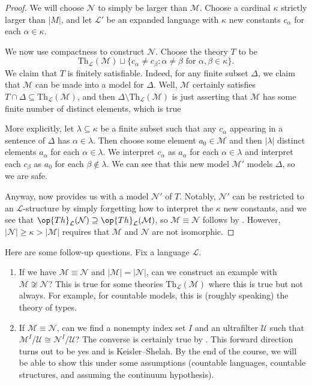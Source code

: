 \documentclass[../notes.tex]{subfiles}
\begin{document}
\begin{proof}
	We will choose $\mathcal N$ to simply be larger than $\mathcal M$. Choose a cardinal $\kappa$ strictly larger than $\left|M\right|$, and let $\mathcal L'$ be an expanded language with $\kappa$ new constants $c_\alpha$ for each $\alpha\in\kappa$.

	We now use compactness to construct $\mathcal N$. Choose the theory $T$ to be
	\[\mathrm{Th}_\mathcal L(\mathcal M)\sqcup\{c_\alpha\ne c_\beta:\alpha\ne\beta\text{ for }\alpha,\beta\in\kappa\}.\]
	We claim that $T$ is finitely satisfiable. Indeed, for any finite subset $\Delta$, we claim that $\mathcal M$ can be made into a model for $\Delta$. Well, $\mathcal M$ certainly satisfies $T\cap\Delta\subseteq\mathrm{Th}_\mathcal L(\mathcal M)$, and then $\Delta\setminus\mathrm{Th}_\mathcal L(\mathcal M)$ is just asserting that $\mathcal M$ has some finite number of distinct elements, which is true
	
	More explicitly, let $\lambda\subseteq\kappa$ be a finite subset such that any $c_\alpha$ appearing in a sentence of $\Delta$ has $\alpha\in\lambda$. Then choose some element $a_0\in\mathcal M$ and then $\left|\lambda\right|$ distinct elements $a_\alpha$ for each $\alpha\in\lambda$. We interpret $c_\alpha$ as $a_\alpha$ for each $\alpha\in\lambda$ and interpret each $c_\beta$ as $a_0$ for each $\beta\notin\lambda$. We can see that this new model $\mathcal M'$ models $\Delta$, so we are safe.

	Anyway,  now provides us with a model $\mathcal N'$ of $T$. Notably, $\mathcal N'$ can be restricted to an $\mathcal L$-structure by simply forgetting how to interpret the $\kappa$ new constants, and we see that $\op{Th}_\mathcal L(\mathcal N)\supseteq\op{Th}_\mathcal L(\mathcal M)$, so $\mathcal M\equiv\mathcal N$ follows by . However, $\left|\mathcal N\right|\ge\kappa>\left|\mathcal M\right|$ requires that $\mathcal M$ and $\mathcal N$ are not isomorphic.
\end{proof}
Here are some follow-up questions. Fix a language $\mathcal L$.
\begin{enumerate}
	\item If we have $\mathcal M\equiv\mathcal N$ and $\left|\mathcal M\right|=\left|\mathcal N\right|$, can we construct an example with $\mathcal M\not\cong\mathcal N$? This is true for some theories $\mathrm{Th}_\mathcal L(\mathcal M)$ where this is true but not always. For example, for countable models, this is (roughly speaking) the theory of types.
	\item If $\mathcal M\equiv\mathcal N$, can we find a nonempty index set $I$ and an ultrafilter $\mathcal U$ such that $\mathcal M^I/\mathcal U\cong\mathcal N^I/\mathcal U$? The converse is certainly true by . This forward direction turns out to be yes and is Keisler--Shelah. By the end of the course, we will be able to show this under some assumptions (countable languages, countable structures, and assuming the continuum hypothesis).
\end{enumerate}
\end{document}
